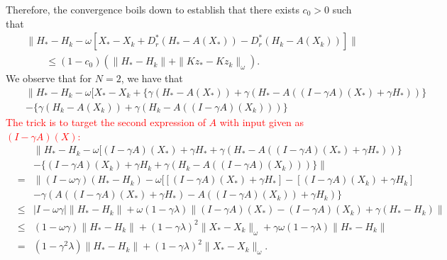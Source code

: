 \begin{itemize}
Therefore, the convergence boils down to establish that there exists $c_0 > 0$ such that 
\begin{eqnarray*}
&& \|H_* - H_k - \omega [X_* - X_k + D_r^* (H_* - A(X_*)) - D_r^* (H_k - A(X_k))] \| \\
&&\qquad \leq (1 - c_0) \left ( \|H_{*} - H_{k}\| + \|Kz_* - Kz_{k}\|_{\omega} \right ). 
\end{eqnarray*}
We observe that for $N = 2$, we have that 
\begin{eqnarray*}
&&  \|H_* - H_k - \omega [X_* - X_k + \{ \gamma ( H_* - A(X_*) ) + \gamma (H_* - A((I - \gamma A)(X_*) + \gamma H_*)) \} \\
&& 
- \{ \gamma ( H_k - A(X_k)) + \gamma (H_k - A((I - \gamma A)(X_k))) \}
\end{eqnarray*}
\textcolor{red}{The trick is to target the second expression of $A$ with input given as $(I - \gamma A)(X)$:} 
\begin{eqnarray*}
&&  \|H_* - H_k - \omega [(I - \gamma A)(X_*) + \gamma H_* +  \gamma (H_* - A((I - \gamma A)(X_*) + \gamma H_*)) \} \\
&& 
- \{(I - \gamma A)(X_k) + \gamma H_k + \gamma (H_k - A((I - \gamma A)(X_k))) \} \| \\ 
&=& \|(I - \omega \gamma) (H_* - H_k) - \omega [[(I - \gamma A)(X_*) + \gamma H_*] - [(I - \gamma A)(X_k) + \gamma H_k] \\
&& - \gamma ( A((I - \gamma A)(X_*) + \gamma H_*) - A((I - \gamma A)(X_k)) + \gamma H_k) \} \\ 
&\leq& |I - \omega \gamma |\|H_* - H_k\| + \omega (1 - \gamma \lambda) \|(I - \gamma A)(X_*) - (I - \gamma A)(X_k) + \gamma (H_* - H_k)\| \\ 
&\leq& (1 - \omega \gamma) \|H_* - H_k\| + (1 - \gamma \lambda)^2 \|X_* - X_k\|_\omega + \gamma \omega (1 - \gamma \lambda) \|H_* - H_k\| \\ 
&=& (1 - \gamma^2 \lambda) \|H_* - H_k\| + (1 - \gamma \lambda)^2 \|X_* - X_k\|_\omega. 
\end{eqnarray*}





\end{itemize}
